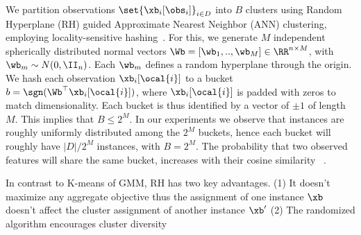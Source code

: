 \documentclass[letterpaper]{article}
\renewcommand{\cite}{\citep}
\begin{document}
 
We partition observations $\set{\xb_i[\obs_i]}_{i\in D}$ into $B$ clusters using Random Hyperplane (RH) guided Approximate Nearest Neighbor (ANN) clustering, employing locality-sensitive hashing~\cite{indyk1999approximate}. For this, we generate $M$ independent spherically distributed normal vectors $\Wb = [\wb_1,..,\wb_M] \in \RR^{n\times M}$, with $\wb_{m}\sim N(0,\II_{n})$. Each $\wb_m$ defines a random hyperplane through the origin. We hash each observation $\xb_i[\ocal{i}]$ to a bucket $b = \sgn(\Wb^\top \xb_i[\ocal{i}])$, where $\xb_i[\ocal{i}]$ is padded with zeros to match dimensionality. Each bucket is thus identified by a vector of $\pm 1$ of length $M$. This implies that $B\le 2^M$. In our experiments we observe that instances are roughly uniformly distributed among the $2^M$ buckets, hence each bucket will roughly have $|D|/2^M$ instances, with $B=2^M$. The probability that two observed features will share the same bucket, increases with their cosine similarity ~\citet[Section 3]{charikar2002similarity}.

In contrast to K-means of GMM, RH has two key advantages. (1) It doesn't maximize any aggregate objective thus the assignment of one instance $\xb$ doesn't affect the cluster assignment of another instance $\xb'$
(2) The randomized algorithm encourages cluster diversity
\end{document}
